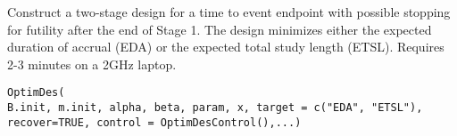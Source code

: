 \begin{Description}\relax
Construct a two-stage design for a time to event endpoint with possible stopping for futility
after the end of Stage 1.  The design  minimizes either the expected
duration of accrual (EDA) or the expected total study length
(ETSL). Requires 2-3 minutes on a 2GHz laptop.
\end{Description}
\begin{Usage}
\begin{verbatim}
OptimDes(
B.init, m.init, alpha, beta, param, x, target = c("EDA", "ETSL"),
recover=TRUE, control = OptimDesControl(),...)

\end{verbatim}
\end{Usage}
